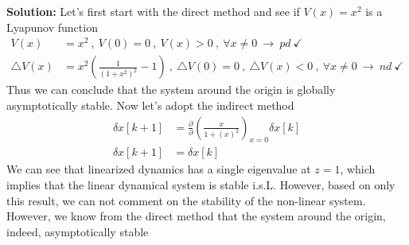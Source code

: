 \documentclass[twoside]{article}
\begin{document}
\textbf{Solution:} Let's first start with the direct method and see if $V(x) = x^2$ is a Lyapunov function
%
\begin{align*}
V(x) &= x^2 \ , \ V(0) = 0 \ , \ V(x) > 0 \ , \ \forall x \neq 0 \ \rightarrow \ pd \ \checkmark
\\
\triangle V(x) &= x^2 \left( \frac{1}{(1 + x^2)^2} - 1 \right)  \ , \ \triangle V(0) = 0 \ , \ \triangle V(x) < 0 \ , \ \forall x \neq 0 \ \rightarrow \ nd \ \checkmark
\end{align*}
%
Thus we can conclude that the system around the origin is globally asymptotically stable. Now
let's adopt the indirect method
%
\begin{align*}
 \delta x[k+1] &= \frac{\partial 
 }{\partial} \left(
 \frac{x}{1 + (x)^2} \right)_{x=0} \delta x[k]
 \\
\delta x[k+1] &= \delta x[k]
\end{align*}
%
We can see that linearized dynamics has a single eigenvalue at $z = 1$, which implies that the linear dynamical system is stable i.s.L. However, based on only this result, we can not comment on the stability of the non-linear system. However, we know from the direct method that the system around the origin, indeed, asymptotically stable



\end{document}
